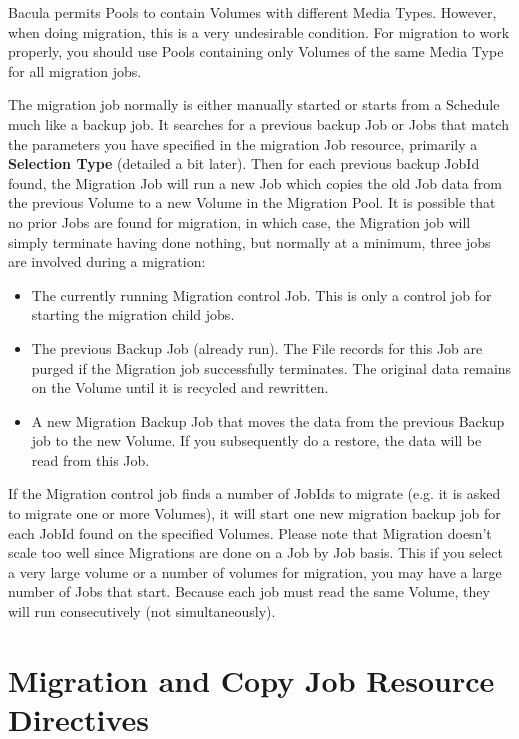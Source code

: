 Bacula permits Pools to contain Volumes with different Media Types.
However, when doing migration, this is a very undesirable condition.  For
migration to work properly, you should use Pools containing only Volumes of
the same Media Type for all migration jobs.
       
The migration job normally is either manually started or starts
from a Schedule much like a backup job. It searches
for a previous backup Job or Jobs that match the parameters you have
specified in the migration Job resource, primarily a {\bf Selection Type}
(detailed a bit later).  Then for
each previous backup JobId found, the Migration Job will run a new Job which
copies the old Job data from the previous Volume to a new Volume in
the Migration Pool.  It is possible that no prior Jobs are found for
migration, in which case, the Migration job will simply terminate having
done nothing, but normally at a minimum, three jobs are involved during a
migration:

\begin{itemize}
\item The currently running Migration control Job. This is only
      a control job for starting the migration child jobs.
\item The previous Backup Job (already run). The File records
      for this Job are purged if the Migration job successfully
      terminates.  The original data remains on the Volume until
      it is recycled and rewritten.
\item A new Migration Backup Job that moves the data from the 
      previous Backup job to the new Volume.  If you subsequently
      do a restore, the data will be read from this Job.
\end{itemize}

If the Migration control job finds a number of JobIds to migrate (e.g. 
it is asked to migrate one or more Volumes), it will start one new
migration backup job for each JobId found on the specified Volumes.
Please note that Migration doesn't scale too well since Migrations are
done on a Job by Job basis. This if you select a very large volume or
a number of volumes for migration, you may have a large number of
Jobs that start. Because each job must read the same Volume, they will
run consecutively (not simultaneously).

\section{Migration and Copy Job Resource Directives}

